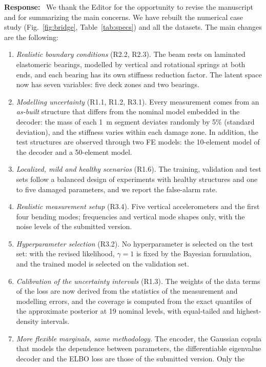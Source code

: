\documentclass[11pt]{article}
\newenvironment{response}{\par\smallskip\noindent\color{resp}\textbf{Response:}\ }{\par}
\begin{document}
\begin{response}
We thank the Editor for the opportunity to revise the manuscript and for summarizing the main concerns. We have
rebuilt the numerical case study (Fig.~\ref{fig:bridge}, Table~\ref{tab:specs}) and all the datasets. The main changes
are the following:
\begin{enumerate}[leftmargin=*]
\item \emph{Realistic boundary conditions} (R2.2, R2.3). The beam rests on laminated elastomeric bearings, modelled
by vertical and rotational springs at both ends, and each bearing has its own stiffness reduction factor. The latent
space now has seven variables: five deck zones and two bearings.
\item \emph{Modelling uncertainty} (R1.1, R1.2, R3.1). Every measurement comes from an \emph{as-built} structure that
differs from the nominal model embedded in the decoder: the mass of each 1~m segment deviates randomly by 5\% (standard
deviation), and the stiffness varies within each damage zone. In addition, the test structures are observed through
two FE models: the 10-element model of the decoder and a 50-element model.
\item \emph{Localized, mild and healthy scenarios} (R1.6). The training, validation and test sets follow a balanced
design of experiments with healthy structures and one to five damaged parameters, and we report the false-alarm rate.
\item \emph{Realistic measurement setup} (R3.4). Five vertical accelerometers and the first four bending modes;
frequencies and vertical mode shapes only, with the noise levels of the submitted version.
\item \emph{Hyperparameter selection} (R3.2). No hyperparameter is selected on the test set: with the revised
likelihood, $\gamma=1$ is fixed by the Bayesian formulation, and the trained model is selected on the validation set.
\item \emph{Calibration of the uncertainty intervals} (R1.3). The weights of the data terms of the loss are now derived
from the statistics of the measurement and modelling errors, and the coverage is computed from the exact quantiles of
the approximate posterior at 19 nominal levels, with equal-tailed and highest-density intervals.
\item \emph{More flexible marginals, same methodology.} The encoder, the Gaussian copula that models the dependence
between parameters, the differentiable eigenvalue decoder and the ELBO loss are those of the submitted version. Only the

\end{enumerate}
\end{response}
\end{document}
